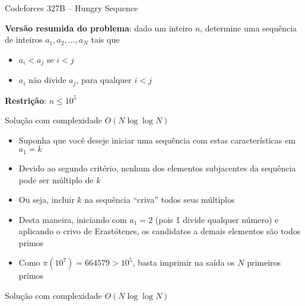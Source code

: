 \begin{frame}[fragile]{Codeforces 327B -- Hungry Sequence}

    \textbf{Versão resumida do problema}: dado um inteiro $n$, determine uma sequência de inteiros
        $a_1, a_2, \ldots, a_N$ tais que

    \begin{itemize}
        \item $a_i < a_j$ se $i < j$
        \item $a_i$ não divide $a_j$, para qualquer $i < j$
    \end{itemize}

    \vspace{0.1in}
    \textbf{Restrição}: $n \leq 10^5$

\end{frame}

\begin{frame}[fragile]{Solução com complexidade $O(N\log \log N)$}

    \begin{itemize}
        \item Suponha que você deseje iniciar uma sequência com estas características em $a_1 = k$

        \item Devido ao segundo critério, nenhum dos elementos subjacentes da sequência pode ser 
            múltiplo de $k$

        \item Ou seja, incluir $k$ na sequência ``criva'' todos seus múltiplos

        \item Desta maneira, iniciando com $a_1 = 2$ (pois 1 divide qualquer número) e aplicando
            o crivo de Erastótenes, os candidatos a demais elementos são todos primos

        \item Como $\pi(10^7) = 664579 > 10^5$, basta imprimir na saída os $N$ primeiros primos
    \end{itemize}

\end{frame}

\begin{frame}[fragile]{Solução com complexidade $O(N\log \log N)$}
\end{frame}
